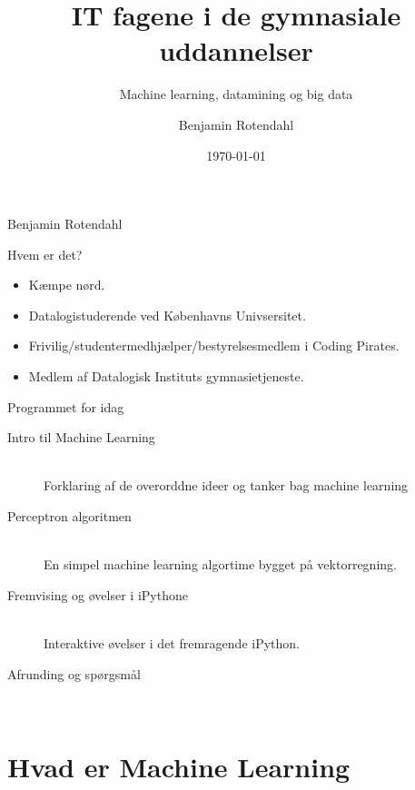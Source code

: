 \documentclass[12pt,t]{beamer}
\title{IT fagene i de gymnasiale uddannelser}
\subtitle{Machine learning, datamining og big data}
\author{
        Benjamin Rotendahl
}
\date[]{\today}
\begin{document}
\frame{\titlepage}

\begin{frame}[c]{Benjamin Rotendahl}
    \begin{block}{Hvem er det?}
        \begin{itemize}
            \item Kæmpe nørd. \pause
            \item Datalogistuderende ved Københavns Univsersitet. \pause
            \item Frivilig/studentermedhjælper/bestyrelsesmedlem i  Coding
                  Pirates. \pause
            \item Medlem af Datalogisk Instituts gymnasietjeneste.
        \end{itemize}
    \end{block}
\end{frame}


\begin{frame}[c]{Programmet for idag}
        \begin{description}
            \item[\alert{Intro til Machine Learning}]~\\
            Forklaring af de overorddne ideer og tanker bag machine learning

            \pause
            \item[\alert{Perceptron algoritmen}]~\\
            En simpel machine learning algortime bygget på vektorregning.

            \pause
            \item[\alert{Fremvising og øvelser i iPythone}]~\\
            Interaktive øvelser i det fremragende iPython.

            \pause
            \item[\alert{Afrunding og spørgsmål}]~\\
        \end{description}
\end{frame}

 \section{Hvad er Machine Learning}
\end{document}
